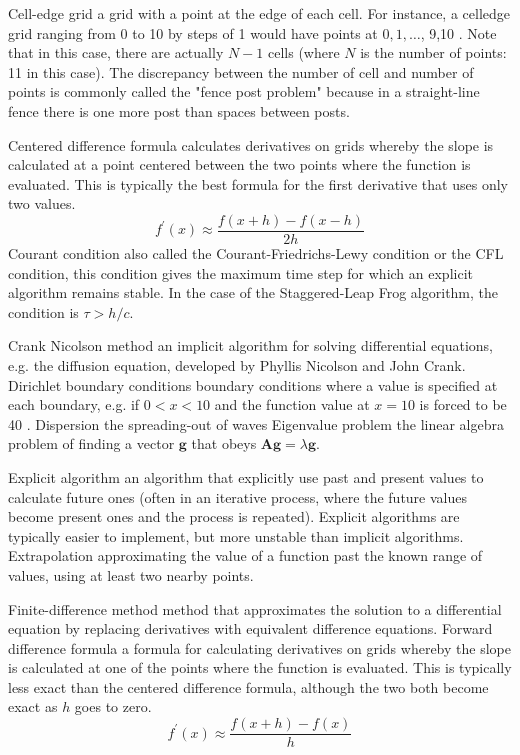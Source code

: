 \documentclass{book}
\theoremstyle{plain}
\theoremstyle{definition}
\numberwithin{exm}{chapter}
\theoremstyle{remark}
\theoremstyle{summary}
\theoremstyle{overview}
\begin{document}
Cell-edge grid a grid with a point at the edge of each cell. For instance, a celledge grid ranging from 0 to 10 by steps of 1 would have points at $0,1, \ldots$, 9,10 . Note that in this case, there are actually $N-1$ cells (where $N$ is the number of points: 11 in this case). The discrepancy between the number of cell and number of points is commonly called the "fence post problem" because in a straight-line fence there is one more post than spaces between posts.

Centered difference formula calculates derivatives on grids whereby the slope is calculated at a point centered between the two points where the function is evaluated. This is typically the best formula for the first derivative that uses only two values.
$$
f^{\prime}(x) \approx \frac{f(x+h)-f(x-h)}{2 h}
$$
Courant condition also called the Courant-Friedrichs-Lewy condition or the CFL condition, this condition gives the maximum time step for which an explicit algorithm remains stable. In the case of the Staggered-Leap Frog algorithm, the condition is $\tau>h / c$.

Crank Nicolson method an implicit algorithm for solving differential equations, e.g. the diffusion equation, developed by Phyllis Nicolson and John Crank.
Dirichlet boundary conditions boundary conditions where a value is specified at each boundary, e.g. if $0<x<10$ and the function value at $x=10$ is forced to be 40 .
Dispersion the spreading-out of waves
Eigenvalue problem the linear algebra problem of finding a vector $\mathbf{g}$ that obeys $\mathbf{A g}=\lambda \mathbf{g}$.

Explicit algorithm an algorithm that explicitly use past and present values to calculate future ones (often in an iterative process, where the future values become present ones and the process is repeated). Explicit algorithms are typically easier to implement, but more unstable than implicit algorithms.
Extrapolation approximating the value of a function past the known range of values, using at least two nearby points.

Finite-difference method method that approximates the solution to a differential equation by replacing derivatives with equivalent difference equations.
Forward difference formula a formula for calculating derivatives on grids whereby the slope is calculated at one of the points where the function is evaluated. This is typically less exact than the centered difference formula, although the two both become exact as $h$ goes to zero.
$$
f^{\prime}(x) \approx \frac{f(x+h)-f(x)}{h}
$$
\end{document}
